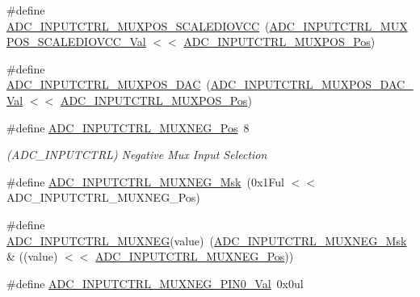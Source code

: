 \begin{DoxyCompactItemize}
\item 
\#define \mbox{\hyperlink{group___s_a_m_d21___a_d_c_ga79bc3be734d17eee64613b1effca6242}{A\+D\+C\+\_\+\+I\+N\+P\+U\+T\+C\+T\+R\+L\+\_\+\+M\+U\+X\+P\+O\+S\+\_\+\+S\+C\+A\+L\+E\+D\+I\+O\+V\+CC}}~(\mbox{\hyperlink{group___s_a_m_d21___a_d_c_ga3d2c77a183f5a2294d33f2bbc77fa637}{A\+D\+C\+\_\+\+I\+N\+P\+U\+T\+C\+T\+R\+L\+\_\+\+M\+U\+X\+P\+O\+S\+\_\+\+S\+C\+A\+L\+E\+D\+I\+O\+V\+C\+C\+\_\+\+Val}} $<$$<$ \mbox{\hyperlink{group___s_a_m_d21___a_d_c_ga583868be285e1c06c9a93dfd552d8c6a}{A\+D\+C\+\_\+\+I\+N\+P\+U\+T\+C\+T\+R\+L\+\_\+\+M\+U\+X\+P\+O\+S\+\_\+\+Pos}})
\item 
\#define \mbox{\hyperlink{group___s_a_m_d21___a_d_c_ga5ca175d514b9f556044908a6cedbe673}{A\+D\+C\+\_\+\+I\+N\+P\+U\+T\+C\+T\+R\+L\+\_\+\+M\+U\+X\+P\+O\+S\+\_\+\+D\+AC}}~(\mbox{\hyperlink{group___s_a_m_d21___a_d_c_ga3dcf66ff42fdb4efc566c4790b431ed9}{A\+D\+C\+\_\+\+I\+N\+P\+U\+T\+C\+T\+R\+L\+\_\+\+M\+U\+X\+P\+O\+S\+\_\+\+D\+A\+C\+\_\+\+Val}}  $<$$<$ \mbox{\hyperlink{group___s_a_m_d21___a_d_c_ga583868be285e1c06c9a93dfd552d8c6a}{A\+D\+C\+\_\+\+I\+N\+P\+U\+T\+C\+T\+R\+L\+\_\+\+M\+U\+X\+P\+O\+S\+\_\+\+Pos}})
\item 
\#define \mbox{\hyperlink{group___s_a_m_d21___a_d_c_ga47f933ef105812dd56ccffab8f7a0877}{A\+D\+C\+\_\+\+I\+N\+P\+U\+T\+C\+T\+R\+L\+\_\+\+M\+U\+X\+N\+E\+G\+\_\+\+Pos}}~8
\begin{DoxyCompactList}\small\item\em (A\+D\+C\+\_\+\+I\+N\+P\+U\+T\+C\+T\+RL) Negative Mux Input Selection \end{DoxyCompactList}\item 
\#define \mbox{\hyperlink{group___s_a_m_d21___a_d_c_ga7f4645d2ed7208d0f2544c4e253d22a3}{A\+D\+C\+\_\+\+I\+N\+P\+U\+T\+C\+T\+R\+L\+\_\+\+M\+U\+X\+N\+E\+G\+\_\+\+Msk}}~(0x1\+Ful $<$$<$ A\+D\+C\+\_\+\+I\+N\+P\+U\+T\+C\+T\+R\+L\+\_\+\+M\+U\+X\+N\+E\+G\+\_\+\+Pos)
\item 
\#define \mbox{\hyperlink{group___s_a_m_d21___a_d_c_gaa569c83b916a391e858848c6ac3c17f6}{A\+D\+C\+\_\+\+I\+N\+P\+U\+T\+C\+T\+R\+L\+\_\+\+M\+U\+X\+N\+EG}}(value)~(\mbox{\hyperlink{group___s_a_m_d21___a_d_c_ga7f4645d2ed7208d0f2544c4e253d22a3}{A\+D\+C\+\_\+\+I\+N\+P\+U\+T\+C\+T\+R\+L\+\_\+\+M\+U\+X\+N\+E\+G\+\_\+\+Msk}} \& ((value) $<$$<$ \mbox{\hyperlink{group___s_a_m_d21___a_d_c_ga47f933ef105812dd56ccffab8f7a0877}{A\+D\+C\+\_\+\+I\+N\+P\+U\+T\+C\+T\+R\+L\+\_\+\+M\+U\+X\+N\+E\+G\+\_\+\+Pos}}))
\item 
\#define \mbox{\hyperlink{group___s_a_m_d21___a_d_c_ga9d910c6ba24bd46e46c9b4a20ed48fb0}{A\+D\+C\+\_\+\+I\+N\+P\+U\+T\+C\+T\+R\+L\+\_\+\+M\+U\+X\+N\+E\+G\+\_\+\+P\+I\+N0\+\_\+\+Val}}~0x0ul

\end{DoxyCompactItemize}
